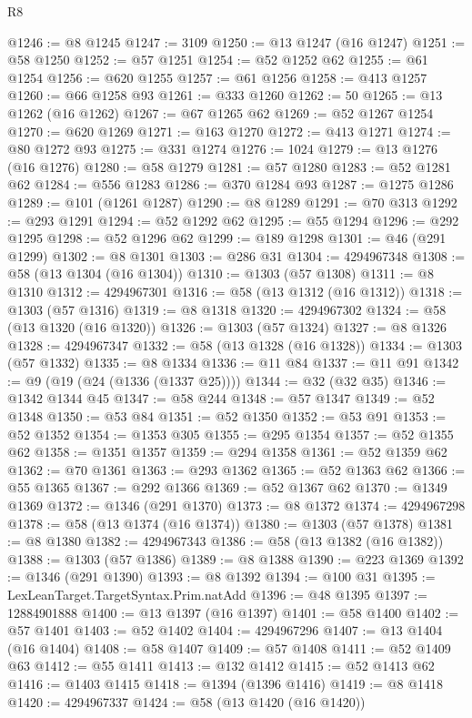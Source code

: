 \begin{lexlean}{R8}
\begin{coremodule}
@1246 := @8 @1245
@1247 := 3109
@1250 := @13 @1247 (@16 @1247)
@1251 := @58 @1250
@1252 := @57 @1251
@1254 := @52 @1252 @62
@1255 := @61 @1254
@1256 := @620 @1255
@1257 := @61 @1256
@1258 := @413 @1257
@1260 := @66 @1258 @93
@1261 := @333 @1260
@1262 := 50
@1265 := @13 @1262 (@16 @1262)
@1267 := @67 @1265 @62
@1269 := @52 @1267 @1254
@1270 := @620 @1269
@1271 := @163 @1270
@1272 := @413 @1271
@1274 := @80 @1272 @93
@1275 := @331 @1274
@1276 := 1024
@1279 := @13 @1276 (@16 @1276)
@1280 := @58 @1279
@1281 := @57 @1280
@1283 := @52 @1281 @62
@1284 := @556 @1283
@1286 := @370 @1284 @93
@1287 := @1275 @1286
@1289 := @101 (@1261 @1287)
@1290 := @8 @1289
@1291 := @70 @313
@1292 := @293 @1291
@1294 := @52 @1292 @62
@1295 := @55 @1294
@1296 := @292 @1295
@1298 := @52 @1296 @62
@1299 := @189 @1298
@1301 := @46 (@291 @1299)
@1302 := @8 @1301
@1303 := @286 @31
@1304 := 4294967348
@1308 := @58 (@13 @1304 (@16 @1304))
@1310 := @1303 (@57 @1308)
@1311 := @8 @1310
@1312 := 4294967301
@1316 := @58 (@13 @1312 (@16 @1312))
@1318 := @1303 (@57 @1316)
@1319 := @8 @1318
@1320 := 4294967302
@1324 := @58 (@13 @1320 (@16 @1320))
@1326 := @1303 (@57 @1324)
@1327 := @8 @1326
@1328 := 4294967347
@1332 := @58 (@13 @1328 (@16 @1328))
@1334 := @1303 (@57 @1332)
@1335 := @8 @1334
@1336 := @11 @84
@1337 := @11 @91
@1342 := @9 (@19 (@24 (@1336 (@1337 @25))))
@1344 := @32 (@32 @35)
@1346 := @1342 @1344 @45
@1347 := @58 @244
@1348 := @57 @1347
@1349 := @52 @1348
@1350 := @53 @84
@1351 := @52 @1350
@1352 := @53 @91
@1353 := @52 @1352
@1354 := @1353 @305
@1355 := @295 @1354
@1357 := @52 @1355 @62
@1358 := @1351 @1357
@1359 := @294 @1358
@1361 := @52 @1359 @62
@1362 := @70 @1361
@1363 := @293 @1362
@1365 := @52 @1363 @62
@1366 := @55 @1365
@1367 := @292 @1366
@1369 := @52 @1367 @62
@1370 := @1349 @1369
@1372 := @1346 (@291 @1370)
@1373 := @8 @1372
@1374 := 4294967298
@1378 := @58 (@13 @1374 (@16 @1374))
@1380 := @1303 (@57 @1378)
@1381 := @8 @1380
@1382 := 4294967343
@1386 := @58 (@13 @1382 (@16 @1382))
@1388 := @1303 (@57 @1386)
@1389 := @8 @1388
@1390 := @223 @1369
@1392 := @1346 (@291 @1390)
@1393 := @8 @1392
@1394 := @100 @31
@1395 := LexLeanTarget.TargetSyntax.Prim.natAdd
@1396 := @48 @1395
@1397 := 12884901888
@1400 := @13 @1397 (@16 @1397)
@1401 := @58 @1400
@1402 := @57 @1401
@1403 := @52 @1402
@1404 := 4294967296
@1407 := @13 @1404 (@16 @1404)
@1408 := @58 @1407
@1409 := @57 @1408
@1411 := @52 @1409 @63
@1412 := @55 @1411
@1413 := @132 @1412
@1415 := @52 @1413 @62
@1416 := @1403 @1415
@1418 := @1394 (@1396 @1416)
@1419 := @8 @1418
@1420 := 4294967337
@1424 := @58 (@13 @1420 (@16 @1420))

\end{coremodule}
\end{lexlean}
